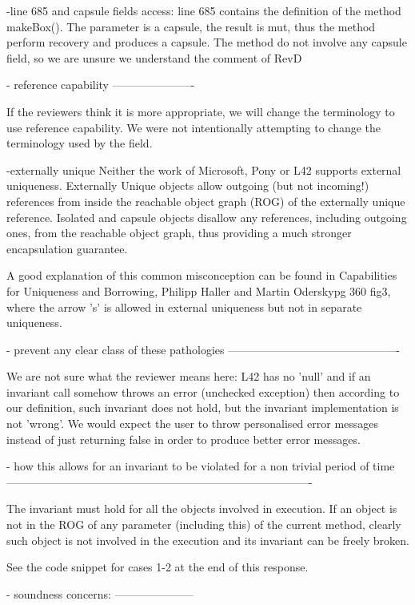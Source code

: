 -line 685 and capsule fields access:
line 685 contains the definition of the method makeBox().
The parameter is a capsule, the result is mut, thus the method perform recovery and produces a capsule.
The method do not involve any capsule field, so we are unsure we understand the comment of RevD

- reference capability
----------------------

If the reviewers think it is more appropriate,
we will change the terminology to use reference capability.
We were not intentionally attempting to change the terminology used by the field.

-externally unique
Neither the work of Microsoft, Pony or L42 supports external uniqueness.
Externally Unique objects allow outgoing (but not incoming!) references from inside the reachable object graph (ROG)
of the externally unique reference.
Isolated and capsule objects disallow any references, including outgoing ones, from the reachable object graph,
thus providing a much stronger encapsulation guarantee.

A good explanation of this common misconception can be found in
Capabilities for Uniqueness and Borrowing, Philipp Haller and Martin Oderskypg 360 fig3,
where the arrow 's' is allowed in external uniqueness but not in separate uniqueness.


- prevent any clear class of these pathologies
----------------------------------------------

We are not sure what the reviewer means here: L42 has no 'null' and if an invariant call
somehow throws an error (unchecked exception) then according to our definition,
such invariant does not hold, but the invariant implementation is not 'wrong'.
We would expect the user to throw personalised error messages instead of just returning false
in order to produce better error messages.

- how this allows for an invariant to be violated for a non trivial period of time
----------------------------------------------------------------------------------

The invariant must hold for all the objects involved in execution.
If an object is not in the ROG of any parameter (including this) of the current method,
clearly such object is not involved in the execution and its invariant can be freely broken.

See the code snippet for cases 1-2 at the end of this response.


- soundness concerns:
---------------------


